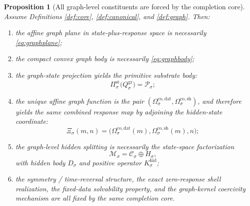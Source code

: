 \documentclass[11pt]{article}
\newcommand{\ProtoSpace}[1]{\mathcal M_{#1}}
\newcommand{\ProtoBody}[1]{\mathcal P_{#1}}
\newcommand{\ResponseMap}[1]{\Xi_{#1}}
\newcommand{\GapSpace}[1]{H_{#1}}
\newcommand{\GapBody}[1]{D_{#1}}
\newcommand{\HiddenOperator}[1]{K_{#1}^{\mathrm{hid}}}
\newcommand{\CoreState}[1]{\mathcal C_{#1}}
\newcommand{\CoreDataMap}[1]{\Omega_{#1}^{\mathrm{co,dat}}}
\newcommand{\CoreShellMap}[1]{\Omega_{#1}^{\mathrm{co,sh}}}
\newcommand{\GraphBody}[1]{Q_{#1}^{\mathrm{gr}}}
\newcommand{\StateProj}[1]{\Pi_{#1}^{\mathrm{st}}}
\newtheorem{proposition}{Proposition}
\begin{document}
\begin{proposition}[All graph-level constituents are forced by the completion core]
\label{prop:forcedgraph}
Assume Definitions \ref{def:core}, \ref{def:canonical}, and \ref{def:graph}. Then:
\begin{enumerate}
    \item the affine graph plane in state-plus-response space is necessarily \eqref{eq:graphplane};
    \item the compact convex graph body is necessarily \eqref{eq:graphbody};
    \item the graph-state projection yields the primitive substrate body:
    \[
    \StateProj{\sigma}\bigl(\GraphBody{\sigma}\bigr)=\ProtoBody{\sigma};
    \]
    \item the unique affine graph function is the pair \((\CoreDataMap{\sigma},\CoreShellMap{\sigma})\), and therefore yields the same combined response map by adjoining the hidden-state coordinate:
    \[
    \ResponseMap{\sigma}(m,n)
    =
    \bigl(
    \CoreDataMap{\sigma}(m),
    \CoreShellMap{\sigma}(m),
    n
    \bigr);
    \]
    \item the graph-level hidden splitting is necessarily the state-space factorization
    \[
    \ProtoSpace{\sigma}
    =
    \CoreState{\sigma}\oplus\GapSpace{\sigma},
    \]
    with hidden body \(\GapBody{\sigma}\) and positive operator \(\HiddenOperator{\sigma}\);
    \item the symmetry / time-reversal structure, the exact zero-response shell realization, the fixed-data solvability property, and the graph-kernel coercivity mechanism are all fixed by the same completion core.
\end{enumerate}
\end{proposition}
\end{document}
